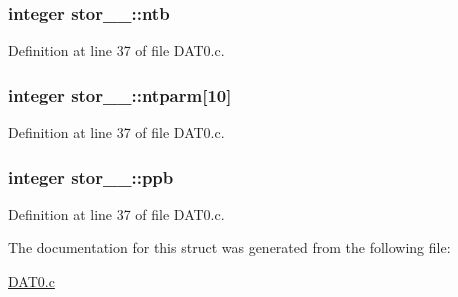\subsubsection[{\texorpdfstring{ntb}{ntb}}]{\setlength{\rightskip}{0pt plus 5cm}integer stor\+\_\+\_\+\+::ntb}\hypertarget{structstor__1___a2128265ba5866af2771204f9b4c914de}{}\label{structstor__1___a2128265ba5866af2771204f9b4c914de}


Definition at line 37 of file D\+A\+T0.\+c.

\subsubsection[{\texorpdfstring{ntparm}{ntparm}}]{\setlength{\rightskip}{0pt plus 5cm}integer stor\+\_\+\_\+\+::ntparm\mbox{[}10\mbox{]}}\hypertarget{structstor__1___a71312f529db491234e65d8d51ef6ca35}{}\label{structstor__1___a71312f529db491234e65d8d51ef6ca35}


Definition at line 37 of file D\+A\+T0.\+c.

\subsubsection[{\texorpdfstring{ppb}{ppb}}]{\setlength{\rightskip}{0pt plus 5cm}integer stor\+\_\+\_\+\+::ppb}\hypertarget{structstor__1___af0eb7e8d14d6c2e60ccecc144080d09a}{}\label{structstor__1___af0eb7e8d14d6c2e60ccecc144080d09a}


Definition at line 37 of file D\+A\+T0.\+c.



The documentation for this struct was generated from the following file\+:\begin{DoxyCompactItemize}
\item 
\hyperlink{DAT0_8c}{D\+A\+T0.\+c}\end{DoxyCompactItemize}
